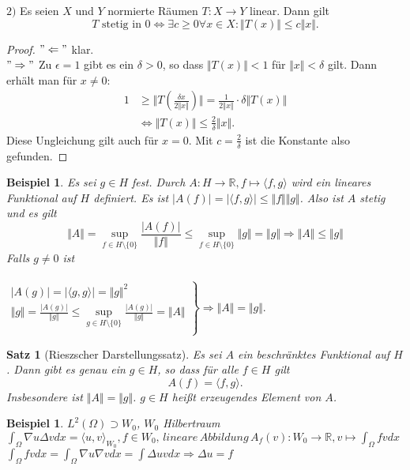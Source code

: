 \documentclass[12pt,titlepage]{article}
\newtheorem{bsp}[zahl]{Beispiel}
\newtheorem{satz}[zahl]{Satz}
\numberwithin{equation}{section}
\begin{document}
$2)$ Es seien $X$ und $Y$ normierte Räumen $T:X \to Y$ linear. Dann gilt 
\[
T \text{ stetig in }0 \Leftrightarrow \exists c \geq 0 \forall x\in X :\Vert T(x) \Vert \leq c \Vert x \Vert .
\]
\begin{proof}
$"\Leftarrow"$ klar.\\
$"\Rightarrow"$ Zu $\epsilon=1$ gibt es ein $\delta>0$, so dass $\Vert T(x)\Vert <1$ für $\Vert x \Vert < \delta$ gilt. Dann erhält man für $x\neq 0$:
\begin{align*}
1 &\geq \Vert T(\frac{\delta x}{2 \Vert x \Vert }) \Vert =\frac{1}{2 \Vert x \Vert }\cdot \delta \Vert T(x) \Vert\\
&\Leftrightarrow \Vert T(x) \Vert \leq \frac{2}{\delta} \Vert x \Vert.
\end{align*}
Diese Ungleichung gilt auch für $x=0$. Mit $c=\frac{2}{\delta}$ ist die Konstante also gefunden. 
\end{proof}
\begin{bsp}
Es sei $g \in H$ fest. Durch $A:H\to \mathbb{R},f\mapsto \langle f,g\rangle$ wird ein lineares Funktional auf $H$ definiert. Es ist $\vert A(f)\vert=\vert \langle f,g \rangle \vert\leq\Vert f\Vert \Vert g\Vert$. Also ist $A$ stetig und es gilt 
\[
\Vert A \Vert = \underset{f\in H\setminus \{0\}}{\sup} \frac{\vert A(f)\vert}{\Vert f\Vert } \leq  \underset{f\in H\setminus \{0\}}{\sup} \Vert g \Vert =\Vert g \Vert \Rightarrow \Vert A \Vert \leq \Vert g \Vert
\]
Falls $g\neq 0$ ist \\\\
$\left.\begin{matrix}
\vert A(g) \vert =\vert \langle g,g\rangle \vert=\Vert g\Vert^2\\
\Vert g \Vert = \frac{\vert A(g) \vert }{\Vert g \Vert}\leq \underset{g\in H\setminus \{0\}}{\sup} \frac{\vert A(g)\vert}{\Vert g\Vert }=\Vert A \Vert\\
\end{matrix} \right\rbrace \Rightarrow \Vert A \Vert = \Vert g \Vert.$
\end{bsp}
\begin{satz}[Rieszscher Darstellungssatz]
Es sei $A$ ein beschränktes Funktional auf $H$. Dann gibt es genau ein $g \in H$, so dass für alle $f \in H$ gilt
\[
A(f)=\langle f,g \rangle.
\]
Insbesondere ist $\Vert A \Vert =\Vert g\Vert $. $g \in H$ heißt erzeugendes Element von $A$.
\end{satz}
\begin{bsp}
$L^2(\Omega)\supset W_0$, $W_0$ Hilbertraum\\
$\int_{\Omega} \nabla u \Delta v dx=\langle u,v\rangle_{W_0}, f\in W_0, \, lineare \,Abbildung \,A_f(v):W_0 \to \mathbb{R}, v \mapsto \int_{\Omega} fvdx$\\
$\int_{\Omega} fv dx=\int_{\Omega}\nabla u \nabla v dx =\int \Delta uv dx \Rightarrow \Delta u=f$
\end{bsp}
\end{document}

